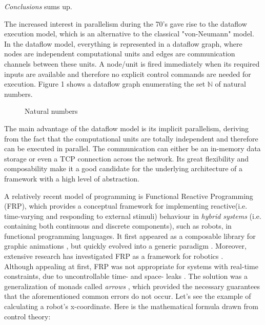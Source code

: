 \documentclass{dithesis}
\begin{document}
\textit{Conclusions} sums up.


The increased interest in parallelism during the 70's gave rise to the dataflow execution model, which is an alternative to the classical "von-Neumann" model. In the dataflow model, everything is represented in a dataflow graph, where nodes are independent computational units  and edges are communication channels between these units. A node/unit is fired immediately when its required inputs are available and therefore no explicit control commands are needed for execution. Figure 1 shows a dataflow graph enumerating the set $\mathbb{N}$ of natural numbers.

\begin{figure}[h!] \begin{center} 
		
	\caption{Natural numbers}
\end{center} \end{figure}


The main advantage of the dataflow model is its implicit parallelism, deriving from the fact that the computational units are totally independent and therefore can be executed in parallel. The communication can either be an in-memory data storage or even a TCP connection across the network. Its great flexibility and composability make it a good candidate for the underlying architecture of a framework with a high level of abstraction.

A relatively recent model of programming is Functional Reactive Programming (FRP), which provides a conceptual framework for implementing reactive(i.e. time-varying and responding to external stimuli) behaviour in \textit{hybrid systems} (i.e. containing both continuous and discrete components), such as robots, in functional programming languages. It first appeared as a composable library for graphic animations \cite{fran}, but quickly evolved into a generic paradigm \cite{survey_frp,real_frp,pushpull_frp}. Moreover, extensive research has investigated FRP as a framework for robotics \cite{arrows_robots,lambda_in_motion}. \\
Although appealing at first, FRP was not appropriate for systems  with real-time constraints, due to uncontrollable time- and space- leaks \cite{event_frp}. The solution was a generalization of monads called \textit{arrows} \cite{arrows}, which provided the necessary guarantees that the aforementioned common errors do not occur. Let's see the example of calculating a robot's x-coordinate. Here is the mathematical formula drawn from control theory:
\end{document}
